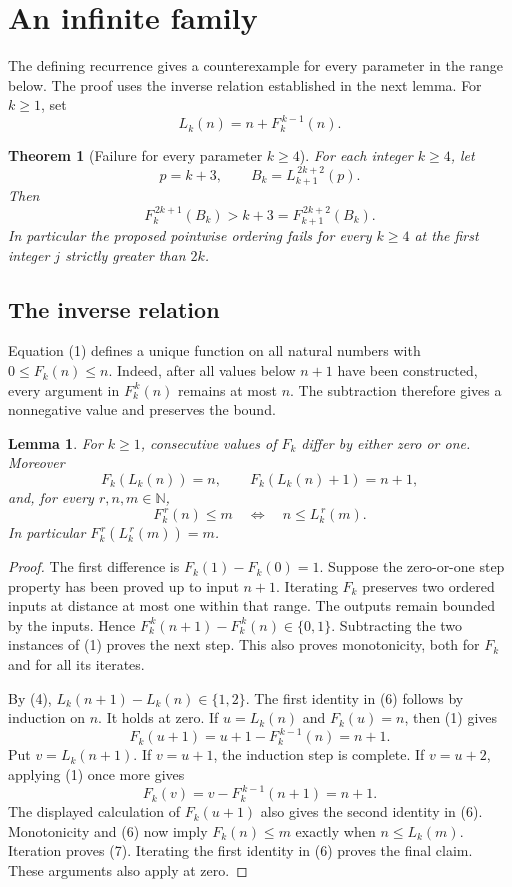 \documentclass[11pt,a4paper]{article}
\newtheorem{theorem}{Theorem}
\newtheorem{lemma}{Lemma}
\newcommand{\N}{\mathbb N}
\newcommand{\itf}[2]{F_{#1}^{\,#2}}
\newcommand{\itl}[2]{L_{#1}^{\,#2}}
\begin{document}
\section{An infinite family}

The defining recurrence gives a counterexample for every parameter in
the range below. The proof uses the inverse relation established in
the next lemma.
For \(k\ge1\), set
\[
 L_k(n)=n+\itf{k}{k-1}(n).
 \tag{4}
\]

\begin{theorem}[Failure for every parameter \(k\ge4\)]\label{thm:family}
For each integer \(k\ge4\), let
\[
 p=k+3,\qquad B_k=\itl{k+1}{2k+2}(p).
\]
Then
\[
 \boxed{\itf{k}{2k+1}(B_k)>k+3
      =\itf{k+1}{2k+2}(B_k).}
 \tag{5}
\]
In particular the proposed pointwise ordering fails for every \(k\ge4\)
at the first integer \(j\) strictly greater than \(2k\).
\end{theorem}

\subsection{The inverse relation}

Equation (1) defines a unique function on all natural numbers with
\(0\le F_k(n)\le n\).
Indeed, after all values below \(n+1\) have been constructed, every argument in
\(\itf{k}{k}(n)\) remains at most \(n\).
The subtraction therefore gives a nonnegative value and preserves the bound.

\begin{lemma}
For \(k\ge1\), consecutive values of \(F_k\) differ by either zero or one.
Moreover
\[
 F_k(L_k(n))=n,\qquad F_k(L_k(n)+1)=n+1,
 \tag{6}
\]
and, for every \(r,n,m\in\N\),
\[
 \itf{k}{r}(n)\le m\quad\Longleftrightarrow\quad n\le\itl{k}{r}(m).
 \tag{7}
\]
In particular \(\itf{k}{r}(\itl{k}{r}(m))=m\).
\end{lemma}

\begin{proof}
The first difference is \(F_k(1)-F_k(0)=1\). Suppose the zero-or-one step property
has been proved up to input \(n+1\). Iterating \(F_k\) preserves two ordered
inputs at distance at most one within that range. The outputs remain bounded
by the inputs. Hence
\(\itf{k}{k}(n+1)-\itf{k}{k}(n)\in\{0,1\}\).
Subtracting the two instances of (1) proves the next step. This also proves
monotonicity, both for \(F_k\) and for all its iterates.

By (4), \(L_k(n+1)-L_k(n)\in\{1,2\}\). The first identity in (6) follows
by induction on \(n\). It holds at zero. If \(u=L_k(n)\) and \(F_k(u)=n\),
then (1) gives
\[
 F_k(u+1)=u+1-\itf{k}{k-1}(n)=n+1.
\]
Put \(v=L_k(n+1)\). If \(v=u+1\), the induction step is complete. If
\(v=u+2\), applying (1) once more gives
\[
 F_k(v)=v-\itf{k}{k-1}(n+1)=n+1.
\]
The displayed calculation of \(F_k(u+1)\) also gives the second identity in (6).
Monotonicity and (6) now imply
\(F_k(n)\le m\) exactly when \(n\le L_k(m)\).
Iteration proves (7). Iterating the first identity in (6) proves the final
claim. These arguments also apply at zero.
\end{proof}
\end{document}
